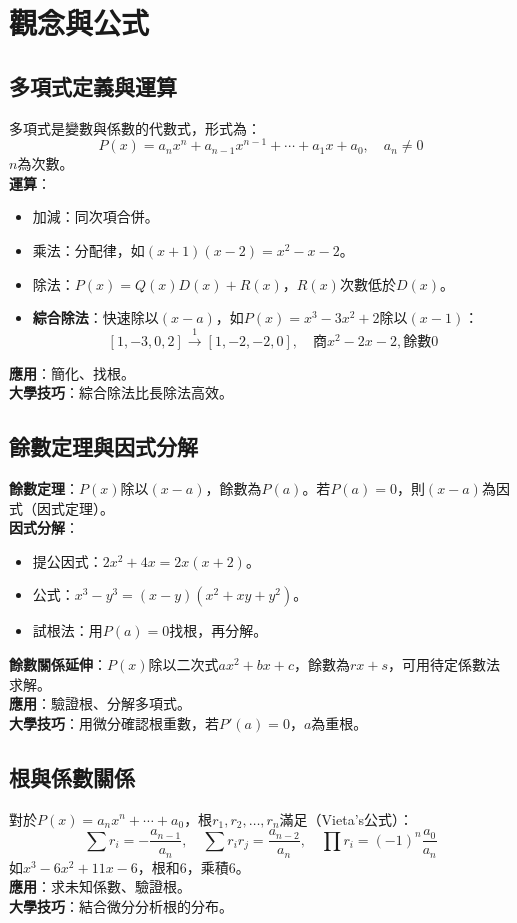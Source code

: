 
\section{觀念與公式}

\subsection{多項式定義與運算}
多項式是變數與係數的代數式，形式為：
\[
P(x) = a_n x^n + a_{n-1} x^{n-1} + \cdots + a_1 x + a_0, \quad a_n \neq 0
\]
$n$為次數。\\
\textbf{運算}：
\begin{itemize}
    \item 加減：同次項合併。
    \item 乘法：分配律，如$(x + 1)(x - 2) = x^2 - x - 2$。
    \item 除法：$P(x) = Q(x)D(x) + R(x)$，$R(x)$次數低於$D(x)$。
    \item \textbf{綜合除法}：快速除以$(x - a)$，如$P(x) = x^3 - 3x^2 + 2$除以$(x - 1)$：
    \[
    [1, -3, 0, 2] \xrightarrow{1} [1, -2, -2, 0], \quad \text{商} x^2 - 2x - 2, \text{餘數} 0
    \]
\end{itemize}
\textbf{應用}：簡化、找根。\\
\textbf{大學技巧}：綜合除法比長除法高效。

\subsection{餘數定理與因式分解}
\textbf{餘數定理}：$P(x)$除以$(x - a)$，餘數為$P(a)$。若$P(a) = 0$，則$(x - a)$為因式（因式定理）。\\
\textbf{因式分解}：
\begin{itemize}
    \item 提公因式：$2x^2 + 4x = 2x(x + 2)$。
    \item 公式：$x^3 - y^3 = (x - y)(x^2 + xy + y^2)$。
    \item 試根法：用$P(a) = 0$找根，再分解。
\end{itemize}
\textbf{餘數關係延伸}：$P(x)$除以二次式$ax^2 + bx + c$，餘數為$rx + s$，可用待定係數法求解。\\
\textbf{應用}：驗證根、分解多項式。\\
\textbf{大學技巧}：用微分確認根重數，若$P'(a) = 0$，$a$為重根。

\subsection{根與係數關係}
對於$P(x) = a_n x^n + \cdots + a_0$，根$r_1, r_2, \ldots, r_n$滿足（Vieta's公式）：
\[
\sum r_i = -\frac{a_{n-1}}{a_n}, \quad \sum r_i r_j = \frac{a_{n-2}}{a_n}, \quad \prod r_i = (-1)^n \frac{a_0}{a_n}
\]
如$x^3 - 6x^2 + 11x - 6$，根和$6$，乘積$6$。\\
\textbf{應用}：求未知係數、驗證根。\\
\textbf{大學技巧}：結合微分分析根的分布。

